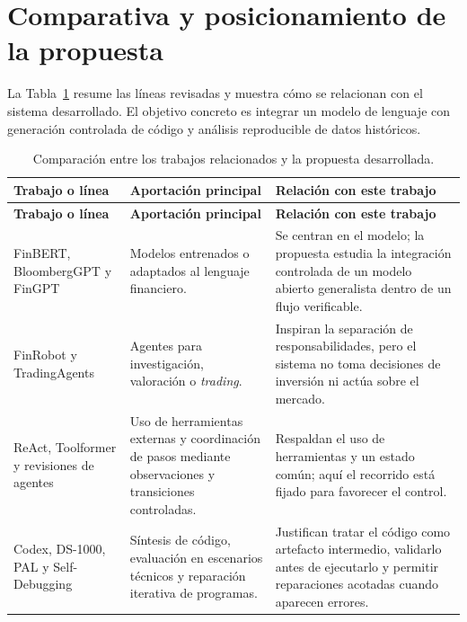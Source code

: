 \section{Comparativa y posicionamiento de la propuesta}

La Tabla~\ref{tab:comparativa_estado_arte} resume las l\'ineas revisadas y muestra c\'omo se relacionan con el sistema desarrollado. El objetivo concreto es integrar un modelo de lenguaje con generaci\'on controlada de c\'odigo y an\'alisis reproducible de datos hist\'oricos.

{\scriptsize
\begin{longtable}{>{\raggedright\arraybackslash}p{3.1cm}>{\raggedright\arraybackslash}p{4.45cm}>{\raggedright\arraybackslash}p{6.0cm}}
\caption{Comparaci\'on entre los trabajos relacionados y la propuesta desarrollada.}
\label{tab:comparativa_estado_arte}\\
\toprule
\textbf{Trabajo o l\'inea} & \textbf{Aportaci\'on principal} & \textbf{Relaci\'on con este trabajo} \\
\midrule
\endfirsthead
\toprule
\textbf{Trabajo o l\'inea} & \textbf{Aportaci\'on principal} & \textbf{Relaci\'on con este trabajo} \\
\midrule
\endhead
FinBERT, BloombergGPT y FinGPT \cite{araci2019finbert,wu2023bloomberggpt,yang2023fingpt} & Modelos entrenados o adaptados al lenguaje financiero. & Se centran en el modelo; la propuesta estudia la integraci\'on controlada de un modelo abierto generalista dentro de un flujo verificable. \\
FinRobot y TradingAgents \cite{zhou2024finrobot,xiao2024tradingagents} & Agentes para investigaci\'on, valoraci\'on o \textit{trading}. & Inspiran la separaci\'on de responsabilidades, pero el sistema no toma decisiones de inversi\'on ni act\'ua sobre el mercado. \\
ReAct, Toolformer y revisiones de agentes \cite{yao2022react,schick2023toolformer,wang2023agentsurvey} & Uso de herramientas externas y coordinaci\'on de pasos mediante observaciones y transiciones controladas. & Respaldan el uso de herramientas y un estado com\'un; aqu\'i el recorrido est\'a fijado para favorecer el control. \\
Codex, DS-1000, PAL y Self-Debugging \cite{chen2021codex,lai2022ds1000,gao2022pal,chen2023selfdebug} & S\'intesis de c\'odigo, evaluaci\'on en escenarios t\'ecnicos y reparaci\'on iterativa de programas. & Justifican tratar el c\'odigo como artefacto intermedio, validarlo antes de ejecutarlo y permitir reparaciones acotadas cuando aparecen errores. \\

\end{longtable}}
